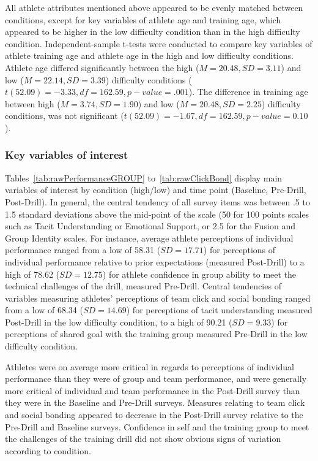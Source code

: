 \begin{CJK}{UTF8}{gbsn}
All athlete attributes mentioned above appeared to be evenly matched between conditions, except for key variables of athlete age and training age, which appeared to be higher in the low difficulty condition than in the high difficulty condition. Independent-sample t-tests were conducted to compare key variables of athlete training age and athlete age in the high and low difficulty conditions. Athlete age differed significantly between the high ($M= 20.48, SD =3.11$) and low ($M= 22.14, SD =3.39$) difficulty conditions ($t(52.09) = -3.33, df = 162.59, p-value = .001$).  The difference in training age between high ($M= 3.74, SD =1.90$) and low ($M= 20.48, SD =2.25$) difficulty conditions, was not significant ($t(52.09)= -1.67, df = 162.59, p-value = 0.10$).




\subsubsection{Key variables of interest \label{sect:surveyResponses}}
Tables~\ref{tab:rawPerformanceGROUP} to~\ref{tab:rawClickBond} display main variables of interest by condition (high/low) and time point (Baseline, Pre-Drill, Post-Drill).  In general, the central tendency of all survey items was between .5 to 1.5 standard deviations above the mid-point of the scale (50 for 100 points scales such as Tacit Understanding or Emotional Support, or 2.5 for the Fusion and Group Identity scales.   For instance, average athlete perceptions of individual performance ranged from a low of 58.31 ($SD = 17.71$) for perceptions of individual performance relative to prior expectations (measured Post-Drill) to a high of 78.62 ($SD = 12.75$) for athlete confidence in group ability to meet the technical challenges of the drill, measured Pre-Drill.  Central tendencies of variables measuring athletes' perceptions of team click and social bonding ranged from a low of 68.34 ($SD = 14.69$) for perceptions of tacit understanding measured Post-Drill in the low difficulty condition, to a high of 90.21 ($SD = 9.33$) for perceptions of shared goal with the training group measured Pre-Drill in the low difficulty condition.

Athletes were on average more critical in regards to perceptions of individual performance than they were of group and team performance, and were generally more critical of individual and team performance in the Post-Drill survey than they were in the Baseline and Pre-Drill surveys.  Measures relating to team click and social bonding appeared to decrease in the Post-Drill survey relative to the Pre-Drill and Baseline surveys. Confidence in self and the training group to meet the challenges of the training drill did not show obvious signs of variation according to condition.


\end{CJK}
